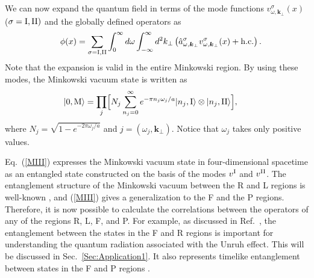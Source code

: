 \documentclass[aps,prd,preprintnumbers,nofootinbib,showpacs,11pt]{revtex4}%
\begin{document}
\begin{widetext}
We can now expand the quantum field in terms of the mode functions 
$v^\sigma_{\omega,\bm k_\perp}(x)$ ($\sigma = {\rm I, II})$ and the globally defined operators as
\begin{eqnarray}
&&\phi(x)=\sum_{\sigma={\rm I,II}}\int_0^\infty d\omega\int_{-\infty}^\infty d^2 k_\perp 
\left(
\hat a^\sigma_{\omega,\bm k_\perp}v^\sigma_{\omega,\bm k_\perp}(x)+{\rm h.c.}
\right) .
\label{mode-I-II}
\end{eqnarray}
Note that the expansion is valid in the entire Minkowski region. 
By using these modes, 
the Minkowski vacuum state is written as 
\begin{eqnarray}
\hspace{-5mm}
  |0,{\rm M}\rangle=\prod_j\Bigl[
N_j\sum_{n_j=0}^\infty e^{-\pi n_j \omega_j/a }|n_j,{\I}\rangle \otimes|n_j,{\II}\rangle
\Bigr]  ,
\label{MIII}
\end{eqnarray}
where $N_j=\sqrt{1-e^{-2\pi \omega_j /a}}$ and  $j=(\omega_j,\bm k_\perp)$. 
Notice that $\omega_j$ takes only positive values.


Eq.~(\ref{MIII}) expresses the Minkowski vacuum state in four-dimensional spacetime
as an entangled state constructed on the basis of the modes $v^{\rm I}$ and $v^{\rm II}$. 
The entanglement structure of the Minkowski vacuum between the R 
and L regions is well-known \cite{Unruh,UnruhWald}, and 
(\ref{MIII}) gives a generalization to the F and the P regions. 
Therefore, it is now possible to calculate the correlations between the operators of any of the regions 
R, L, F, and P.
For example, as discussed in Ref.~\cite{ITUY}, the entanglement between the states in the F
and R regions is important for understanding the quantum radiation associated with the Unruh effect.
This will be discussed in Sec.~\ref{Sec:Application1}.
It also represents timelike entanglement between states
in the F and P regions \cite{OlsonRalph}. 



\end{widetext}
\end{document}
